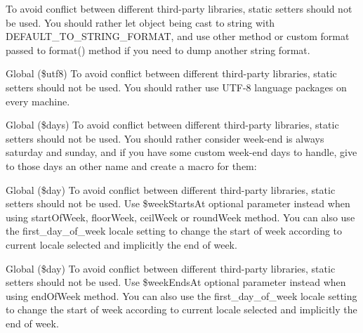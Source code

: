 \begin{DoxyRefList}
%
To avoid conflict between different third-\/party libraries, static setters should not be used. You should rather let  object being cast to string with DEFAULT\+\_\+\+TO\+\_\+\+STRING\+\_\+\+FORMAT, and use other method or custom format passed to format() method if you need to dump another string format. 
\item[Global \doxylink{interface_carbon_1_1_carbon_interface_a7365abcf4bd84f41e0f52ad44ee0c916}{Carbon\+Interface\+::set\+Utf8} (\$utf8)]\label{deprecated__deprecated000115}%
%
To avoid conflict between different third-\/party libraries, static setters should not be used. You should rather use UTF-\/8 language packages on every machine. 
\item[Global \doxylink{interface_carbon_1_1_carbon_interface_ac7aae915f8007e2190757b0d447f0d70}{Carbon\+Interface\+::set\+Weekend\+Days} (\$days)]\label{deprecated__deprecated000118}%
%
To avoid conflict between different third-\/party libraries, static setters should not be used. You should rather consider week-\/end is always saturday and sunday, and if you have some custom week-\/end days to handle, give to those days an other name and create a macro for them\+: 
\item[Global \doxylink{interface_carbon_1_1_carbon_interface_a1832437f00e42770b1c15c526d06de8d}{Carbon\+Interface\+::set\+Week\+Ends\+At} (\$day)]\label{deprecated__deprecated000116}%
%
To avoid conflict between different third-\/party libraries, static setters should not be used. Use \$week\+Starts\+At optional parameter instead when using start\+Of\+Week, floor\+Week, ceil\+Week or round\+Week method. You can also use the \textquotesingle{}first\+\_\+day\+\_\+of\+\_\+week\textquotesingle{} locale setting to change the start of week according to current locale selected and implicitly the end of week. 
\item[Global \doxylink{interface_carbon_1_1_carbon_interface_ad36baa0bb2b77d847ab5bcb6ab6d6b38}{Carbon\+Interface\+::set\+Week\+Starts\+At} (\$day)]\label{deprecated__deprecated000117}%
%
To avoid conflict between different third-\/party libraries, static setters should not be used. Use \$week\+Ends\+At optional parameter instead when using end\+Of\+Week method. You can also use the \textquotesingle{}first\+\_\+day\+\_\+of\+\_\+week\textquotesingle{} locale setting to change the start of week according to current locale selected and implicitly the end of week. 

\end{DoxyRefList}
